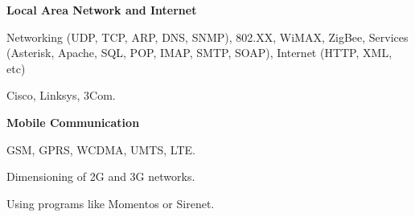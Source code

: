 %
%
%
%
%
%
%
\textbf{Local Area Network and Internet}

\begin{innerlist}
    \item Networking (UDP, TCP, ARP, DNS, SNMP), 802.XX, WiMAX, ZigBee, Services (Asterisk, Apache, SQL, POP, IMAP, SMTP, SOAP), Internet (HTTP, XML, etc)
    \item Cisco, Linksys, 3Com.
\end{innerlist}

\textbf{Mobile Communication}

\begin{innerlist}
	\item GSM, GPRS, WCDMA, UMTS, LTE.
	\item Dimensioning of 2G and 3G networks.
	\item Using programs like Momentos or Sirenet.
\end{innerlist}
%
%
%
%

